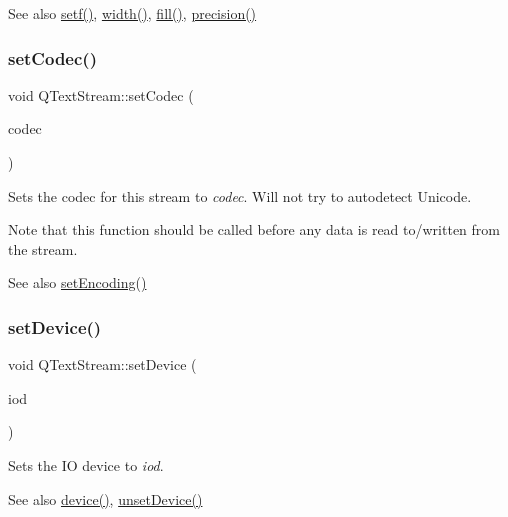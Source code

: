 \begin{DoxySeeAlso}{See also}
\mbox{\hyperlink{class_q_text_stream_adb71ee168e670b470bcbc547b994c5df}{setf()}}, \mbox{\hyperlink{class_q_text_stream_a2ac246266f7cdeb3e14c2964c369fa86}{width()}}, \mbox{\hyperlink{class_q_text_stream_a485699c07b1ea6104a84627876cc2cd9}{fill()}}, \mbox{\hyperlink{class_q_text_stream_a180cd0f2bd8796ba012d338537a2005b}{precision()}} 
\end{DoxySeeAlso}
\mbox{\label{class_q_text_stream_a18bdd4ae41cd9b37ec06827658fbf447}} 
\subsubsection{\texorpdfstring{setCodec()}{setCodec()}}
{\footnotesize\ttfamily void Q\+Text\+Stream\+::set\+Codec (\begin{DoxyParamCaption}\item[{\mbox{\hyperlink{class_q_text_codec}{Q\+Text\+Codec}} $\ast$}]{codec }\end{DoxyParamCaption})}

Sets the codec for this stream to {\itshape codec}. Will not try to autodetect Unicode.

Note that this function should be called before any data is read to/written from the stream.

\begin{DoxySeeAlso}{See also}
\mbox{\hyperlink{class_q_text_stream_ad06dc1f99476aed01fa8a822e871dc44}{set\+Encoding()}} 
\end{DoxySeeAlso}
\mbox{\label{class_q_text_stream_a20bb0f4064d19330d4ed6bb56299fba7}} 
\subsubsection{\texorpdfstring{setDevice()}{setDevice()}}
{\footnotesize\ttfamily void Q\+Text\+Stream\+::set\+Device (\begin{DoxyParamCaption}\item[{\mbox{\hyperlink{class_q_i_o_device}{Q\+I\+O\+Device}} $\ast$}]{iod }\end{DoxyParamCaption})}

Sets the IO device to {\itshape iod}. \begin{DoxySeeAlso}{See also}
\mbox{\hyperlink{class_q_text_stream_a50f5712b3231e41af256c5faadf69512}{device()}}, \mbox{\hyperlink{class_q_text_stream_a6d8aeebd7f4b1cc9f2dce27f6a0d9bd9}{unset\+Device()}} 
\end{DoxySeeAlso}
\mbox{\label{class_q_text_stream_ad06dc1f99476aed01fa8a822e871dc44}} 
